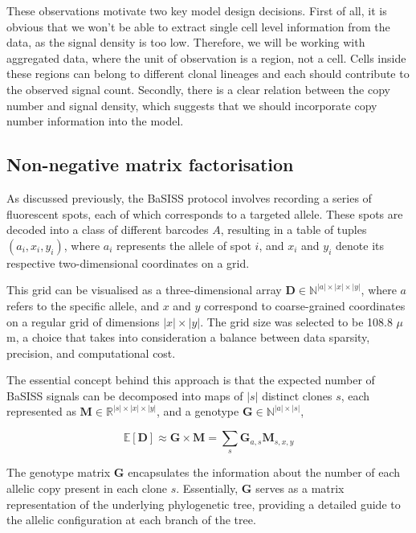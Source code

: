 These observations motivate two key model design decisions. First of all, it is obvious that we won't be able to extract single cell level information from the data, as the signal density is too low. Therefore, we will be working with aggregated data, where the unit of observation is a region, not a cell. Cells inside these regions can belong to different clonal lineages and each should contribute to the observed signal count. Secondly, there is a clear relation between the copy number and signal density, which suggests that we should incorporate copy number information into the model.

\subsection{Non-negative matrix factorisation}
As discussed previously, the \ac{BaSISS} protocol involves recording a series of fluorescent spots, each of which corresponds to a targeted allele. These spots are decoded into a class of different barcodes $A$, resulting in a table of tuples $(a_i, x_i, y_i)$, where $a_i$ represents the allele of spot $i$, and $x_i$ and $y_i$ denote its respective two-dimensional coordinates on a grid.

This grid can be visualised as a three-dimensional array $\mathbf{D} \in \mathbb{N}^{|a| \times |x| \times |y|}$, where $a$ refers to the specific allele, and $x$ and $y$ correspond to coarse-grained coordinates on a regular grid of dimensions $|x| \times |y|$. The grid size was selected to be 108.8 $\mu$ m, a choice that takes into consideration a balance between data sparsity, precision, and computational cost.

The essential concept behind this approach is that the expected number of \ac{BaSISS} signals can be decomposed into maps of $|s|$ distinct clones $s$, each represented as $\mathbf{M} \in \mathbb{R}^{|s| \times |x| \times |y|}$, and a genotype $\mathbf{G} \in \mathbb{N}^{|a| \times |s|}$,

\begin{equation}
    \mathbb{E}[\mathbf{D}] \approx \mathbf{G} \times \mathbf{M} = \sum_{s} \mathbf{G}_{a, s} \mathbf{M}_{s, x, y}
    \label{eq:ED}
\end{equation}

The genotype matrix $\mathbf{G}$ encapsulates the information about the number of each allelic copy present in each clone $s$. Essentially, $\mathbf{G}$ serves as a matrix representation of the underlying phylogenetic tree, providing a detailed guide to the allelic configuration at each branch of the tree. 

